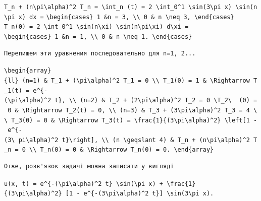 \documentclass[
  ukrainian,
]{article}
\begin{document}
\texttt{T\_n\ +\ (n\textbackslash{}pi\textbackslash{}alpha)\^{}2\ T\_n\ =\ \textbackslash{}int\_n\ (t)\ =\ 2\ \textbackslash{}int\_0\^{}1\ \textbackslash{}sin(3\textbackslash{}pi\ x)\ \textbackslash{}sin(n\textbackslash{}pi\ x)\ dx\ =}
\texttt{\textbackslash{}begin\{cases\}\ 1\ \&n\ =\ 3,\ \textbackslash{}\textbackslash{}\ 0\ \&\ n\ \textbackslash{}neq\ 3,\ \textbackslash{}end\{cases\}}
\texttt{T\_n(0)\ =\ 2\ \textbackslash{}int\_0\^{}1\ \textbackslash{}sin(n\textbackslash{}xi)\ \textbackslash{}sin(n\textbackslash{}pi\textbackslash{}xi)\ d\textbackslash{}xi\ =}
\texttt{\textbackslash{}begin\{cases\}\ 1\ \&n\ =\ 1,\ \textbackslash{}\textbackslash{}\ 0\ \&\ n\ \textbackslash{}neq\ 1.\ \textbackslash{}end\{cases\}}

\begin{verbatim}
Перепишем эти уравнения последовательно для n=1, 2...
\end{verbatim}

\texttt{\textbackslash{}begin\{array\}\{ll\}\ (n=1)\ \&\ T\_1\textquotesingle{}\ +\ (\textbackslash{}pi\textbackslash{}alpha)\^{}2\ T\_1\ =\ 0\ \textbackslash{}\textbackslash{}\ T\_1(0)\ =\ 1\ \&\ \textbackslash{}Rightarrow\ T\_1(t)\ =\ e\^{}\{-(\textbackslash{}pi\textbackslash{}alpha)\^{}2\ t\},\ \textbackslash{}\textbackslash{}\ (n=2)\ \&\ T\_2\textquotesingle{}\ +\ (2\textbackslash{}pi\textbackslash{}alpha)\^{}2\ T\_2\ =\ 0\ \textbackslash{}T\_2\textbackslash{}\ \ (0)\ =\ 0\ \&\ \textbackslash{}Rightarrow\ T\_2(t)\ =\ 0,\ \textbackslash{}\textbackslash{}\ (n=3)\ \&\ T\_3\textquotesingle{}\ +\ (3\textbackslash{}pi\textbackslash{}alpha)\^{}2\ T\_3\ =\ 4\ \textbackslash{}\textbackslash{}\ T\_3(0)\ =\ 0\ \&\ \textbackslash{}Rightarrow\ T\_3(t)\ =\ \textbackslash{}frac\{1\}\{(3\textbackslash{}pi\textbackslash{}alpha)\^{}2\}\ \textbackslash{}left{[}1\ -\ e\^{}\{-(3\textbackslash{}\ pi\textbackslash{}alpha)\^{}2\ t\}\textbackslash{}right{]},\ \textbackslash{}\textbackslash{}\ (n\ \textbackslash{}geqslant\ 4)\ \&\ T\_n\textquotesingle{}\ +\ (n\textbackslash{}pi\textbackslash{}alpha)\^{}2\ T\_n\ =\ 0\ \textbackslash{}\textbackslash{}\ T\_n(0)\ =\ 0\ \&\ \textbackslash{}Rightarrow\ T\_n(0)\ =\ 0.\ \textbackslash{}end\{array\}}

\begin{verbatim}
Отже, розв'язок задачі можна записати у вигляді
\end{verbatim}

\texttt{u(x,\ t)\ =\ e\^{}\{-(\textbackslash{}pi\textbackslash{}alpha)\^{}2\ t\}\ \textbackslash{}sin(\textbackslash{}pi\ x)\ +\ \textbackslash{}frac\{1\}\{(3\textbackslash{}pi\textbackslash{}alpha)\^{}2\}\ {[}1\ -\ e\^{}\{-(3\textbackslash{}pi\textbackslash{}alpha)\^{}2\ t\}{]}\ \textbackslash{}sin(3\textbackslash{}pi\ x).}
\end{document}
